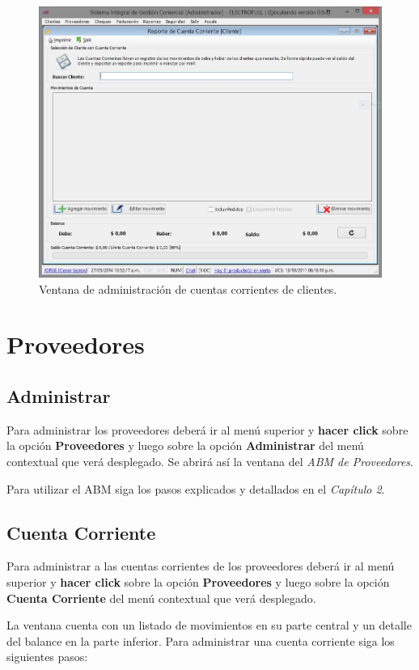 \documentclass{book}
\begin{document}
\begin{figure}[H]
	\centering
	\includegraphics[width=1.0\textwidth]{images/ventanas/ventana-06.jpg}
	\caption{Ventana de administración de cuentas corrientes de clientes.}
	\medskip
\end{figure}
\bigskip



%
%
\chapter{Proveedores}


\section{Administrar}

Para administrar los proveedores deberá ir al menú superior y \textbf{hacer click} sobre la opción \textbf{Proveedores} y luego sobre la opción \textbf{Administrar} del menú contextual que verá desplegado. Se abrirá así la ventana del \textit{ABM de Proveedores}. 
\par
Para utilizar el ABM siga los pasos explicados y detallados en el \textit{Capítulo 2}.
\medskip


\section{Cuenta Corriente}

Para administrar a las cuentas corrientes de los proveedores deberá ir al menú superior y \textbf{hacer click} sobre la opción \textbf{Proveedores} y luego sobre la opción \textbf{Cuenta Corriente} del menú contextual que verá desplegado. 
\par
La ventana cuenta con un listado de movimientos en su parte central y un detalle del balance en la parte inferior. Para administrar una cuenta corriente siga los siguientes pasos:
\end{document}
